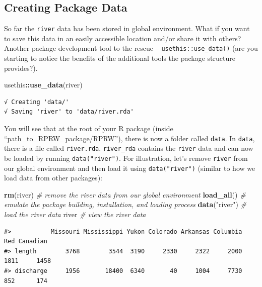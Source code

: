 \documentclass[
]{book}
\newenvironment{Shaded}{\begin{snugshade}}{\end{snugshade}}
\newcommand{\CommentTok}[1]{\textcolor[rgb]{0.56,0.35,0.01}{\textit{#1}}}
\newcommand{\KeywordTok}[1]{\textcolor[rgb]{0.13,0.29,0.53}{\textbf{#1}}}
\newcommand{\NormalTok}[1]{#1}
\newcommand{\OperatorTok}[1]{\textcolor[rgb]{0.81,0.36,0.00}{\textbf{#1}}}
\newcommand{\StringTok}[1]{\textcolor[rgb]{0.31,0.60,0.02}{#1}}
\begin{document}
\hypertarget{creating-data}{%
\subsection{Creating Package Data}\label{creating-data}}

So far the \texttt{river} data has been stored in global environment. What if you want to save this data in an easily accessible location and/or share it with others? Another package development tool to the rescue -- \texttt{usethis::use\_data()} (are you starting to notice the benefits of the additional tools the package structure provides?).

\begin{Shaded}
\begin{Highlighting}[]
\NormalTok{usethis}\OperatorTok{::}\KeywordTok{use_data}\NormalTok{(river)}
\end{Highlighting}
\end{Shaded}

\begin{verbatim}
√ Creating 'data/'
√ Saving 'river' to 'data/river.rda'
\end{verbatim}

You will see that at the root of your R package (inside ``path\_to\_RPRW\_package/RPRW''), there is now a folder called \texttt{data}. In \texttt{data}, there is a file called \texttt{river.rda}. \texttt{river\_rda} contains the \texttt{river} data and can now be loaded by running \texttt{data("river")}. For illustration, let's remove \texttt{river} from our global environment and then load it using \texttt{data("river")} (similar to how we load data from other packages):

\begin{Shaded}
\begin{Highlighting}[]
\KeywordTok{rm}\NormalTok{(river) }\CommentTok{# remove the river data from our global environment}
\KeywordTok{load_all}\NormalTok{() }\CommentTok{# emulate the package building, installation, and loading process}
\KeywordTok{data}\NormalTok{(}\StringTok{"river"}\NormalTok{) }\CommentTok{# load the river data}
\NormalTok{river }\CommentTok{# view the river data}
\end{Highlighting}
\end{Shaded}

\begin{verbatim}
#>           Missouri Mississippi Yukon Colorado Arkansas Columbia  Red Canadian
#> length        3768        3544  3190     2330     2322     2000 1811     1458
#> discharge     1956       18400  6340       40     1004     7730  852      174
\end{verbatim}
\end{document}
